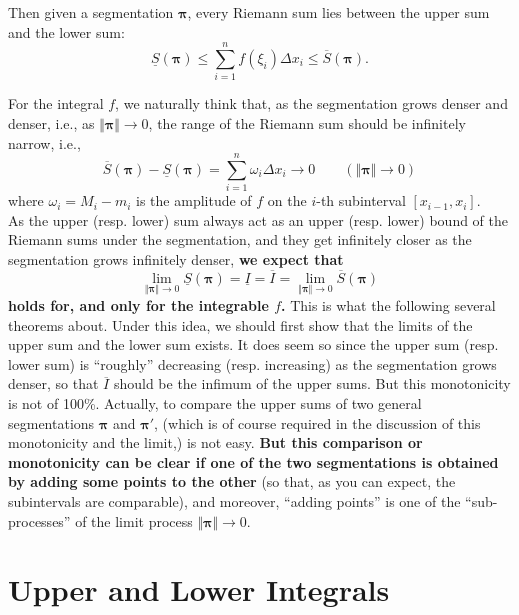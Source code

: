 \documentclass{article}
\newcommand{\lsum}[1]{\underline{S}(\pmb{#1})}
\newcommand{\usum}[1]{\overline{S}(\pmb{#1})}
\begin{document}
Then given a segmentation $\pmb{\pi}$, every Riemann sum lies between the upper sum and the lower sum:
$$ \lsum{\pi} \leq \sum_{i=1}^{n} f(\xi_i)\Delta x_i \leq \usum{\pi}. $$

For the integral $f$, we naturally think that, as the segmentation grows denser and denser, i.e., as $\Vert \pmb{\pi} \Vert \rightarrow 0$, the range of the Riemann sum should be infinitely narrow, i.e.,
$$ \usum{\pi} - \lsum{\pi} = \sum_{i=1}^{n} \omega_i\Delta x_i \rightarrow 0 \qquad (\Vert\pmb{\pi}\Vert\rightarrow 0) $$
where $\omega_i = M_i-m_i$ is the amplitude of $f$ on the $i$-th subinterval $[x_{i-1}, x_i]$. \\
As the upper (resp. lower) sum always act as an upper (resp. lower) bound of the Riemann sums under the segmentation, and they get infinitely closer as the segmentation grows infinitely denser, \textbf{we expect that
$$ \lim_{\Vert\pmb{\pi}\Vert\to 0} \lsum{\pi} = \underline{I} = \overline{I} = \lim_{\Vert\pmb{\pi}\Vert\to 0} \usum{\pi} $$
holds for, and only for the integrable $f$.} This is what the following several theorems about. Under this idea, we should first show that the limits of the upper sum and the lower sum exists. It does seem so since the upper sum (resp. lower sum) is ``roughly'' decreasing (resp. increasing) as the segmentation grows denser, so that $\overline{I}$ should be the infimum of the upper sums. But this monotonicity is not of 100\%. Actually, to compare the upper sums of two general segmentations $\pmb{\pi}$ and $\pmb{\pi}'$, (which is of course required in the discussion of this monotonicity and the limit,) is not easy. \textbf{But this comparison or monotonicity can be clear if one of the two segmentations is obtained by adding some points to the other} (so that, as you can expect, the subintervals are comparable), and moreover, ``adding points'' is one of the ``sub-processes'' of the limit process $\Vert\pmb{\pi}\Vert\to 0$. 

\section{Upper and Lower Integrals}
\end{document}
